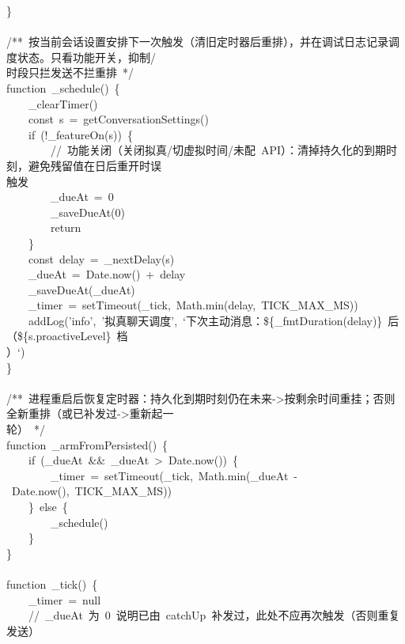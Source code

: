 \documentclass[a4paper,10pt]{article}
\begin{document}
{\ttfamily\footnotesize\raggedright
\}\\
\mbox{}\\
/**~按当前会话设置安排下一次触发（清旧定时器后重排），并在调试日志记录调度状态。只看功能开关，抑制/\\
时段只拦发送不拦重排~*/\\
function~\_schedule()~\{\\
~~~~\_clearTimer()\\
~~~~const~s~=~getConversationSettings()\\
~~~~if~(!\_featureOn(s))~\{\\
~~~~~~~~//~功能关闭（关闭拟真/切虚拟时间/未配~API）：清掉持久化的到期时刻，避免残留值在日后重开时误\\
触发\\
~~~~~~~~\_dueAt~=~0\\
~~~~~~~~\_saveDueAt(0)\\
~~~~~~~~return\\
~~~~\}\\
~~~~const~delay~=~\_nextDelay(s)\\
~~~~\_dueAt~=~Date.now()~+~delay\\
~~~~\_saveDueAt(\_dueAt)\\
~~~~\_timer~=~setTimeout(\_tick,~Math.min(delay,~TICK\_MAX\_MS))\\
~~~~addLog('info',~'拟真聊天调度',~`下次主动消息：\$\{\_fmtDuration(delay)\}~后（\$\{s.proactiveLevel\}~档\\
）`)\\
\}\\
\mbox{}\\
/**~进程重启后恢复定时器：持久化到期时刻仍在未来->按剩余时间重挂；否则全新重排（或已补发过->重新起一\\
轮）~*/\\
function~\_armFromPersisted()~\{\\
~~~~if~(\_dueAt~\&\&~\_dueAt~>~Date.now())~\{\\
~~~~~~~~\_timer~=~setTimeout(\_tick,~Math.min(\_dueAt~-~Date.now(),~TICK\_MAX\_MS))\\
~~~~\}~else~\{\\
~~~~~~~~\_schedule()\\
~~~~\}\\
\}\\
\mbox{}\\
function~\_tick()~\{\\
~~~~\_timer~=~null\\
~~~~//~\_dueAt~为~0~说明已由~catchUp~补发过，此处不应再次触发（否则重复发送）\\
}
\end{document}
